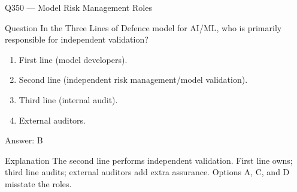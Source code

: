 \documentclass[aspectratio=169,8pt]{beamer}
\begin{document}
\begin{frame}{Q350 --- Model Risk Management Roles}
	\begin{block}{Question}
		In the Three Lines of Defence model for AI/ML, who is primarily responsible for independent validation?
		\begin{enumerate}
			\item First line (model developers).
			\item Second line (independent risk management/model validation).
			\item Third line (internal audit).
			\item External auditors.
	\end{enumerate}  \end{block}
	\begin{exampleblock}{Answer: B}\end{exampleblock}
	\begin{block}{Explanation}
		The second line performs independent validation. First line owns; third line audits; external auditors add extra assurance. Options A, C, and D misstate the roles.
	\end{block}
\end{frame}
\end{document}
